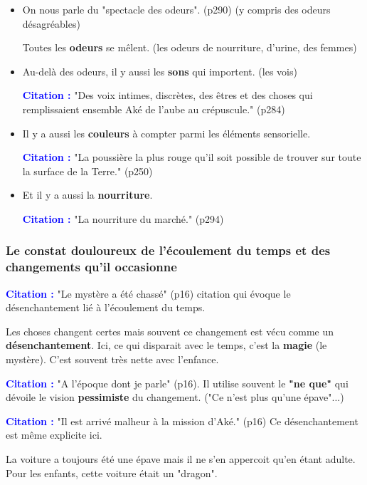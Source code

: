 \documentclass[a4paper, 11pt, hidelinks]{article}
\newcommand{\bs}{\bigskip}
\newcommand{\cit}{\large \textcolor{blue}{\textbf{Citation :}} \large }
\begin{document}
\begin{itemize}
    \item On nous parle du "spectacle des odeurs". (p290) (y compris des odeurs désagréables)

          Toutes les \textbf{odeurs} se mêlent. (les odeurs de nourriture, d'urine, des femmes)


    \item Au-delà des odeurs, il y aussi les \textbf{sons} qui importent. (les vois)

          \cit "Des voix intimes, discrètes, des êtres et des choses qui remplissaient ensemble Aké de l'aube au crépuscule." (p284)


    \item Il y a aussi les \textbf{couleurs} à compter parmi les éléments sensorielle.

          \cit "La poussière la plus rouge qu'il soit possible de trouver sur toute la surface de la Terre." (p250)


    \item Et il y a aussi la \textbf{nourriture}.

          \cit "La nourriture du marché." (p294)
\end{itemize}



\subsubsection{Le constat douloureux de l'écoulement du temps et des changements qu'il occasionne}



\cit "Le mystère a été chassé" (p16) citation qui évoque le désenchantement lié à l'écoulement du temps.

Les choses changent certes mais souvent ce changement est vécu comme un \textbf{désenchantement}. Ici, ce qui disparait avec le temps,
c'est la \textbf{magie} (le mystère). C'est souvent très nette avec l'enfance.
\bs

\cit "A l'époque dont je parle" (p16). Il utilise souvent le \textbf{"ne que"} qui dévoile le vision \textbf{pessimiste} du changement. ("Ce n'est plus qu'une épave"...)

\bs
\cit "Il est arrivé malheur à la mission d'Aké." (p16) Ce désenchantement est même explicite ici.

La voiture a toujours été une épave mais il ne s'en appercoit qu'en étant adulte. Pour les enfants, cette voiture
était un "dragon".
\end{document}
